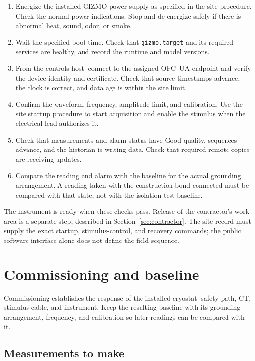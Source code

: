 \documentclass[11pt]{article}
\begin{document}
\begin{enumerate}
  \item Energize the installed GIZMO power supply as specified in the site procedure. Check the normal power indications. Stop and de-energize safely if there is abnormal heat, sound, odor, or smoke.
  \item Wait the specified boot time. Check that \texttt{gizmo.target} and its required services are healthy, and record the runtime and model versions.
  \item From the controls host, connect to the assigned OPC~UA endpoint and verify the device identity and certificate. Check that source timestamps advance, the clock is correct, and data age is within the site limit.
  \item Confirm the waveform, frequency, amplitude limit, and calibration. Use the site startup procedure to start acquisition and enable the stimulus when the electrical lead authorizes it.
  \item Check that measurements and alarm status have Good quality, sequences advance, and the historian is writing data. Check that required remote copies are receiving updates.
  \item Compare the reading and alarm with the baseline for the actual grounding arrangement. A reading taken with the construction bond connected must be compared with that state, not with the isolation-test baseline.
\end{enumerate}

The instrument is ready when these checks pass. Release of the contractor's work area is a separate step, described in Section~\ref{sec:contractor}. The site record must supply the exact startup, stimulus-control, and recovery commands; the public software interface alone does not define the field sequence.

\section{Commissioning and baseline}

Commissioning establishes the response of the installed cryostat, safety path, CT, stimulus cable, and instrument. Keep the resulting baseline with its grounding arrangement, frequency, and calibration so later readings can be compared with it.

\subsection{Measurements to make}
\end{document}
